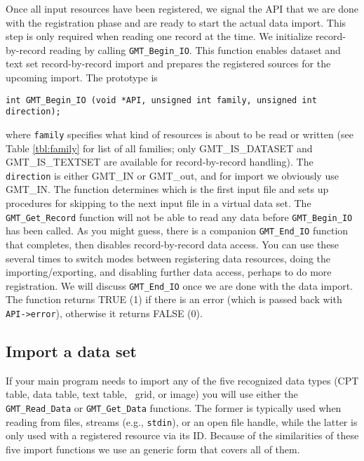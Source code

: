 \documentclass[11pt]{report}
\begin{document}
Once all input resources have been registered, we signal the API that we are done with the registration
phase and are ready to start the actual data import.  This step is only required when reading one record at the
time.  We initialize record-by-record reading by calling \texttt{GMT\_Begin\_IO}.  This
function enables dataset and text set record-by-record import and prepares the registered sources for the upcoming import.
The prototype is

\begin{verbatim}
int GMT_Begin_IO (void *API, unsigned int family, unsigned int direction);
\end{verbatim}
where \texttt{family} specifies what kind of resources is about to be read or written (see Table \ref{tbl:family}
for list of all families; only GMT\_IS\_DATASET and GMT\_IS\_TEXTSET are available for record-by-record handling).
The \texttt{direction} is either GMT\_IN or GMT\_out, and for import we obviously use GMT\_IN.
The function determines which is the first input file and sets up procedures for skipping to the next input file in a virtual data set.
The \texttt{GMT\_Get\_Record} function will not be able to read any data before \texttt{GMT\_Begin\_IO} has been called.  As you might
guess, there is a companion \texttt{GMT\_End\_IO} function that completes, then disables record-by-record data access.  You can use these several
times to switch modes between registering data resources, doing the importing/exporting, and disabling further
data access, perhaps to do more registration.  We will discuss \texttt{GMT\_End\_IO} once we are done with the data import.
The function returns TRUE (1) if there is an error (which is passed back with \texttt{API->error}),
otherwise it returns FALSE (0).

\subsection{Import a data set}

If your main program needs to import any of the five recognized data types (CPT table, data table, text table, \GMT\ grid, or image)
you will use either the \texttt{GMT\_Read\_Data} or \texttt{GMT\_Get\_Data} functions.  The former is typically used when
reading from files, streams (e.g., \texttt{stdin}), or an open file handle, while the latter is only used with a registered resource via
its ID.
Because of the similarities of these five import functions we use
an generic form that covers all of them.
\end{document}
